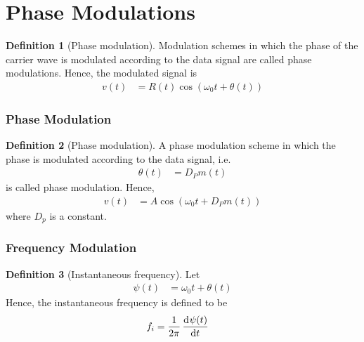 \documentclass[titlepage, fleqn, a4paper, 12pt, twoside]{article}
\theoremstyle{definition}
\newtheorem{definition}{Definition}
\theoremstyle{theorem}
\begin{document}
\clearpage
\part{Phase Modulations}

\begin{definition}[Phase modulation]
	Modulation schemes in which the phase of the carrier wave is modulated according to the data signal are called phase modulations.
	Hence, the modulated signal is
	\begin{align*}
		v(t) &= R(t) \cos\left( \omega_0 t + \theta(t) \right)
	\end{align*}
\end{definition}

\section{Phase Modulation}

\begin{definition}[Phase modulation]
	A phase modulation scheme in which the phase is modulated according to the data signal, i.e.
	\begin{align*}
		\theta(t) &= D_P m(t)
	\end{align*}
	is called phase modulation.
	Hence,
	\begin{align*}
		v(t) &= A \cos\left( \omega_0 t + D_P m(t) \right)
	\end{align*}
	where $D_p$ is a constant.
\end{definition}

\section{Frequency Modulation}

\begin{definition}[Instantaneous frequency]
	Let
	\begin{align*}
		\psi(t) &= \omega_0 t + \theta(t)
	\end{align*}
	Hence, the instantaneous frequency is defined to be
	\begin{align*}
		f_i &= \frac{1}{2 \pi} \dod{\psi(t)}{t}
	\end{align*}
\end{definition}
\end{document}
